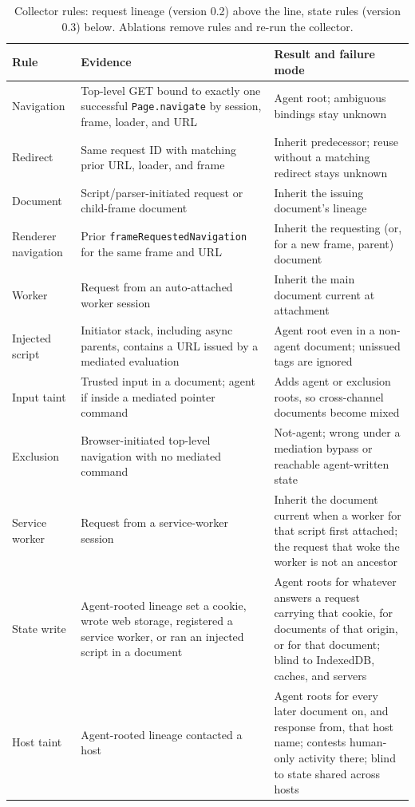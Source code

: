 \documentclass[11pt]{article}
\theoremstyle{definition}
\begin{document}
\begin{table}[tb]
\centering\footnotesize
\begin{tabularx}{\linewidth}{@{}l>{\raggedright\arraybackslash}p{.36\linewidth}Y@{}}
\toprule
Rule & Evidence & Result and failure mode \\
\midrule
Navigation & Top-level GET bound to exactly one successful \texttt{Page.navigate} by session, frame, loader, and URL & Agent root; ambiguous bindings stay unknown \\
Redirect & Same request ID with matching prior URL, loader, and frame & Inherit predecessor; reuse without a matching redirect stays unknown \\
Document & Script/parser-initiated request or child-frame document & Inherit the issuing document's lineage \\
Renderer navigation & Prior \texttt{frameRequestedNavigation} for the same frame and URL & Inherit the requesting (or, for a new frame, parent) document \\
Worker & Request from an auto-attached worker session & Inherit the main document current at attachment \\
Injected script & Initiator stack, including async parents, contains a URL issued by a mediated evaluation & Agent root even in a non-agent document; unissued tags are ignored \\
Input taint & Trusted input in a document; agent if inside a mediated pointer command & Adds agent or exclusion roots, so cross-channel documents become mixed \\
Exclusion & Browser-initiated top-level navigation with no mediated command & Not-agent; wrong under a mediation bypass or reachable agent-written state \\
\midrule
Service worker & Request from a service-worker session & Inherit the document current when a worker for that script first attached; the request that woke the worker is not an ancestor \\
State write & Agent-rooted lineage set a cookie, wrote web storage, registered a service worker, or ran an injected script in a document & Agent roots for whatever answers a request carrying that cookie, for documents of that origin, or for that document; blind to IndexedDB, caches, and servers \\
Host taint & Agent-rooted lineage contacted a host & Agent roots for every later document on, and response from, that host name; contests human-only activity there; blind to state shared across hosts \\
\bottomrule
\end{tabularx}
\caption{Collector rules: request lineage (version 0.2) above the line, state
rules (version 0.3) below. Ablations remove rules and re-run the collector.}
\label{tab:rules}
\end{table}
\end{document}
